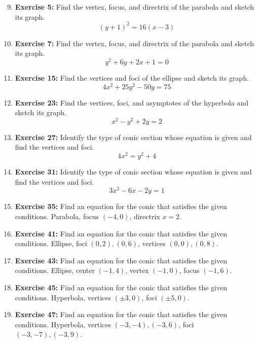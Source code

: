 \documentclass[12pt, a4paper]{article}
\begin{document}
\begin{enumerate}
    \setcounter{enumi}{8}
    \item \textbf{Exercise 5:} Find the vertex, focus, and directrix of the parabola and sketch its graph.
    \[ (y+1)^2 = 16(x-3) \]

    \item \textbf{Exercise 7:} Find the vertex, focus, and directrix of the parabola and sketch its graph.
    \[ y^2 + 6y + 2x + 1 = 0 \]

    \item \textbf{Exercise 15:} Find the vertices and foci of the ellipse and sketch its graph.
    \[ 4x^2 + 25y^2 - 50y = 75 \]

    \item \textbf{Exercise 23:} Find the vertices, foci, and asymptotes of the hyperbola and sketch its graph.
    \[ x^2 - y^2 + 2y = 2 \]

    \item \textbf{Exercise 27:} Identify the type of conic section whose equation is given and find the vertices and foci.
    \[ 4x^2 = y^2 + 4 \]

    \item \textbf{Exercise 31:} Identify the type of conic section whose equation is given and find the vertices and foci.
    \[ 3x^2 - 6x - 2y = 1 \]

    \item \textbf{Exercise 35:} Find an equation for the conic that satisfies the given conditions. Parabola, focus $(-4, 0)$, directrix $x=2$.

    \item \textbf{Exercise 41:} Find an equation for the conic that satisfies the given conditions. Ellipse, foci $(0, 2), (0, 6)$, vertices $(0, 0), (0, 8)$.

    \item \textbf{Exercise 43:} Find an equation for the conic that satisfies the given conditions. Ellipse, center $(-1, 4)$, vertex $(-1, 0)$, focus $(-1, 6)$.

    \item \textbf{Exercise 45:} Find an equation for the conic that satisfies the given conditions. Hyperbola, vertices $(\pm 3, 0)$, foci $(\pm 5, 0)$.

    \item \textbf{Exercise 47:} Find an equation for the conic that satisfies the given conditions. Hyperbola, vertices $(-3, -4), (-3, 6)$, foci $(-3, -7), (-3, 9)$.


\end{enumerate}
\end{document}
